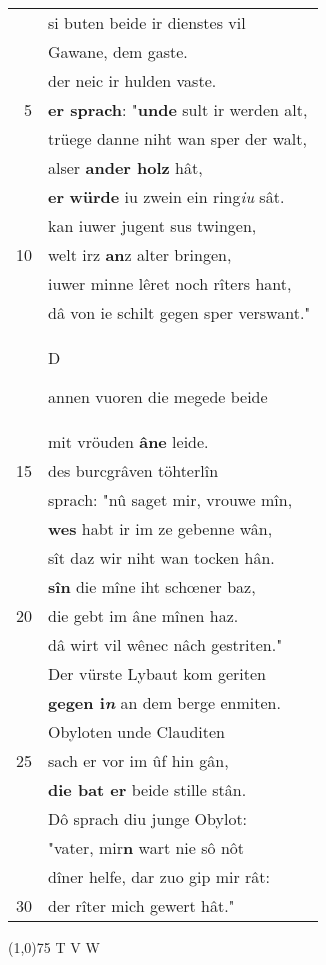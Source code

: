 \documentclass[8pt,a4paper,notitlepage]{article}
\begin{document}
\begin{table}[ht]
\begin{minipage}[t]{0.5\linewidth}
\begin{tabular}{rl}
 & si buten beide ir dienstes vil\\ 
 & Gawane, dem gaste.\\ 
 & der neic ir hulden vaste.\\ 
5 & \textbf{er sprach}: "\textbf{unde} sult ir werden alt,\\ 
 & trüege danne niht wan sper der walt,\\ 
 & alser \textbf{ander holz} hât,\\ 
 & \textbf{er} \textbf{würde} iu zwein ein ring\textit{iu} sât.\\ 
 & kan iuwer jugent sus twingen,\\ 
10 & welt irz \textbf{an}z alter bringen,\\ 
 & iuwer minne lêret noch rîters hant,\\ 
 & dâ von ie schilt gegen sper verswant."\\ 
 & \begin{large}D\end{large}annen vuoren die megede beide\\ 
 & mit vröuden \textbf{âne} leide.\\ 
15 & des burcgrâven töhterlîn\\ 
 & sprach: "nû saget mir, vrouwe mîn,\\ 
 & \textbf{wes} habt ir im ze gebenne wân,\\ 
 & sît daz wir niht wan tocken hân.\\ 
 & \textbf{sîn} die mîne iht schœner baz,\\ 
20 & die gebt im âne mînen haz.\\ 
 & dâ wirt vil wênec nâch gestriten."\\ 
 & Der vürste Lybaut kom geriten\\ 
 & \textbf{gegen i\textit{n}} an dem berge enmiten.\\ 
 & Obyloten unde Clauditen\\ 
25 & sach er vor im ûf hin gân,\\ 
 & \textbf{die bat er} beide stille stân.\\ 
 & Dô sprach diu junge Obylot:\\ 
 & "vater, mir\textbf{n} wart nie sô nôt\\ 
 & dîner helfe, dar zuo gip mir rât:\\ 
30 & der rîter mich gewert hât."\\ 
\end{tabular}
\scriptsize
\line(1,0){75} \newline
T V W \newline

\end{minipage}
\end{table}
\end{document}
